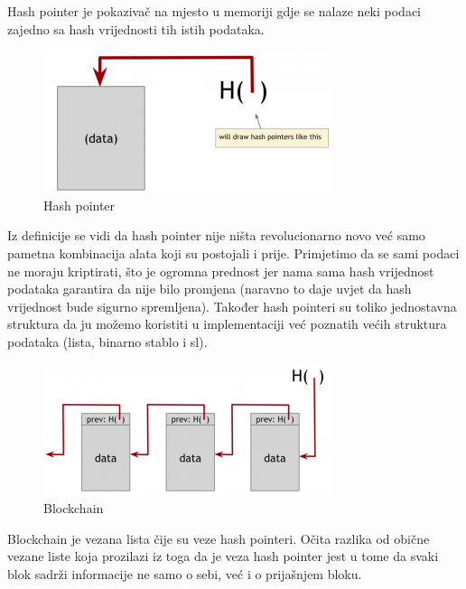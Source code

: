 \documentclass[a4paper,oneside,12pt]{memoir} %
\begin{document}
\begin{definicija}
Hash pointer je pokazivač na mjesto u memoriji gdje se nalaze neki podaci zajedno sa hash vrijednosti tih istih podataka.
\end{definicija}

\begin{figure}[h]
\centering
\includegraphics[scale=0.8]{hash_pointer}
\caption{Hash pointer}
\end{figure}

Iz definicije se vidi da hash pointer nije ništa revolucionarno novo već samo pametna kombinacija alata koji su postojali i prije. Primjetimo da se sami podaci ne moraju kriptirati, što je ogromna prednost jer nama sama hash vrijednost podataka garantira da nije bilo promjena (naravno to daje uvjet da hash vrijednost bude sigurno spremljena). Također hash pointeri su toliko jednostavna struktura da ju možemo koristiti u implementaciji već poznatih većih struktura podataka (lista, binarno stablo i sl).

\begin{figure}[!]
\centering
\includegraphics[scale=0.9]{blockchain}
\caption{Blockchain}
\label{fig:blockchain}
\end{figure}

Blockchain je vezana lista čije su veze hash pointeri. Očita razlika od obične vezane liste koja prozilazi iz toga da je veza hash pointer jest u tome da svaki blok sadrži informacije ne samo o sebi, već i o prijašnjem bloku. 
\end{document}
